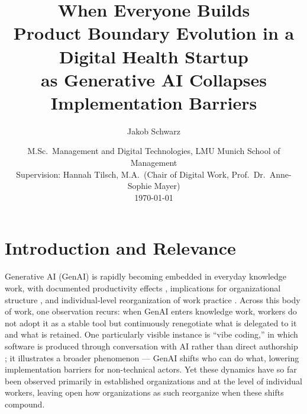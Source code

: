 \documentclass[11pt,a4paper]{article}
\title{\vspace{-2em}\textbf{When Everyone Builds}\\[0.4em]
\large Product Boundary Evolution in a Digital Health Startup\\
as Generative AI Collapses Implementation Barriers}
\author{Jakob Schwarz}
\date{%
  M.Sc.\ Management and Digital Technologies, LMU Munich School of Management\\[0.3em]
  Supervision: Hannah Tilsch, M.A.\ (Chair of Digital Work, Prof.\ Dr.\ Anne-Sophie Mayer)\\[0.3em]
  \today}
\begin{document}
\maketitle
\thispagestyle{empty}

\section{Introduction and Relevance}


Generative AI (GenAI) is rapidly becoming embedded in everyday knowledge work, with documented productivity effects \citep{brynjolfsson2023generative}, implications for organizational structure \citep{alavi2024knowledge}, and individual-level reorganization of work practice \citep{mayer2025generation,jia2024augments,clarke2025beyond,law2025generative}. Across this body of work, one observation recurs: when GenAI enters knowledge work, workers do not adopt it as a stable tool but continuously renegotiate what is delegated to it and what is retained. One particularly visible instance is ``vibe coding,'' in which software is produced through conversation with AI rather than direct authorship \citep{gadde2025democratizing}; it illustrates a broader phenomenon --- GenAI shifts who can do what, lowering implementation barriers for non-technical actors. Yet these dynamics have so far been observed primarily in established organizations and at the level of individual workers, leaving open how organizations as such reorganize when these shifts compound.
\end{document}
